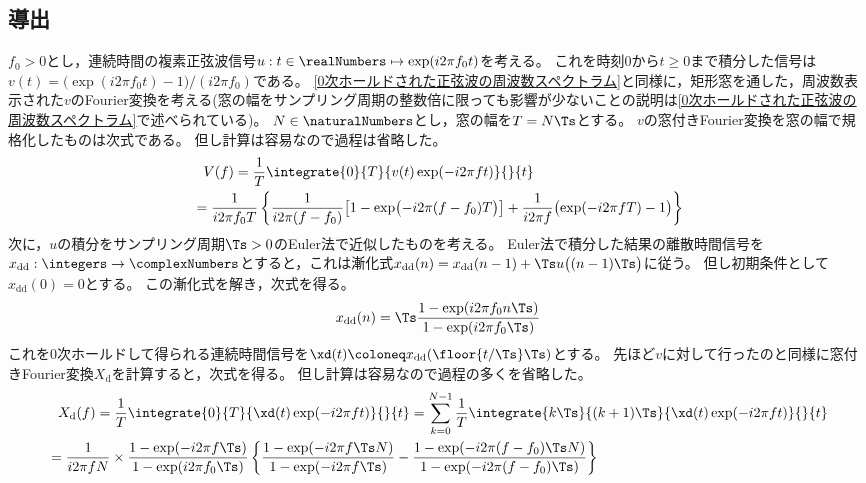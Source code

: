         \subsection{導出}
            \newcommand*{\xdd}{x_\text{dd}}
            \newcommand*{\Xd}{X_\text{d}}
            $f_0>0$とし，連続時間の複素正弦波信号$u:t\in\realNumbers\mapsto\exp(i 2\pi f_0 t)$を考える。
            これを時刻$0$から$t\geq 0$まで積分した信号は$v(t) = \bigl(\exp(i 2\pi f_0 t)-1\bigr) / (i 2\pi f_0)$である。
            \ref{0次ホールドされた正弦波の周波数スペクトラム}と同様に，矩形窓を通した，周波数表示された$v$のFourier変換を考える(窓の幅をサンプリング周期の整数倍に限っても影響が少ないことの説明は\ref{0次ホールドされた正弦波の周波数スペクトラム}で述べられている)。
            $N\in\naturalNumbers$とし，窓の幅を$T=N\Ts$とする。
            $v$の窓付きFourier変換を窓の幅で規格化したものは次式である。
            但し計算は容易なので過程は省略した。
            \begin{align*}
                &\phantom{=} V(f) = \frac{1}{T} \integrate{0}{T}{v(t)\exp(-i 2\pi f t)}{}{t} \\
                &= \frac{1}{i 2\pi f_0 T} \left\{\frac{1}{i 2\pi (f-f_0)}\bigl[1 - \exp\bigl(-i 2\pi (f-f_0)T\bigr)\bigr] + \frac{1}{i 2\pi f}\bigl(\exp(-i 2\pi f T) - 1\bigr)\right\}
            \end{align*}
            次に，$u$の積分をサンプリング周期$\Ts>0$のEuler法で近似したものを考える。
            Euler法で積分した結果の離散時間信号を$\xdd:\integers\to\complexNumbers$とすると，これは漸化式$\xdd(n) = \xdd(n-1) + \Ts u\bigl((n-1)\Ts\bigr)$に従う。
            但し初期条件として$\xdd(0)=0$とする。
            この漸化式を解き，次式を得る。
            \[ \xdd(n) = \Ts\frac{1-\exp(i 2\pi f_0 n\Ts)}{1-\exp(i 2\pi f_0\Ts)} \]
            これを0次ホールドして得られる連続時間信号を$\xd(t) \coloneq \xdd(\floor{t/\Ts}\Ts)$とする。
            先ほど$v$に対して行ったのと同様に窓付きFourier変換$\Xd$を計算すると，次式を得る。
            但し計算は容易なので過程の多くを省略した。
            \begin{align*}
                &\phantom{=} \Xd(f) = \frac{1}{T} \integrate{0}{T}{\xd(t)\exp(-i 2\pi f t)}{}{t} = \sum_{k=0}^{N-1} \frac{1}{T} \integrate{k\Ts}{(k+1)\Ts}{\xd(t)\exp(-i 2\pi f t)}{}{t} \\
                &= \frac{1}{i 2\pi f N}\times\frac{1-\exp(-i 2\pi f\Ts)}{1-\exp(i 2\pi f_0\Ts)} \left\{\frac{1-\exp(-i 2\pi f \Ts N)}{1-\exp(-i 2\pi f \Ts)} - \frac{1-\exp(-i 2\pi (f-f_0) \Ts N)}{1-\exp(-i 2\pi (f-f_0) \Ts)}\right\}
            \end{align*}
